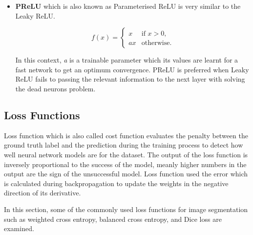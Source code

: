 \begin{itemize}
            \item \textbf{PReLU} which is also known as Parameterised ReLU is very similar to the Leaky ReLU.

                    \begin{equation}
                         f(x) = \begin{cases}
                            x & \text{if } x > 0, \\
                            a x & \text{otherwise}.
                        \end{cases}
                    \end{equation}

                    In this context, \emph{a} is a trainable parameter which its values are learnt for a fast network to get an optimum convergence.
                    PReLU is preferred when Leaky ReLU fails to passing the relevant information to the next layer with solving the dead neurons problem.

        \end{itemize}

    \subsection{Loss Functions}

        Loss function which is also called cost function evaluates the penalty between the ground truth label and the prediction during the training process to detect how well neural network models are for the dataset.
        The output of the loss function is inversely proportional to the success of the model, meanly higher numbers in the output are the sign of the unsuccessful model.
        Loss function used the error which is calculated during backpropagation to update the weights in the negative direction of its derivative.

        In this section, some of the commonly used loss functions for image segmentation such as weighted cross entropy, balanced cross entropy, and Dice loss are examined.

